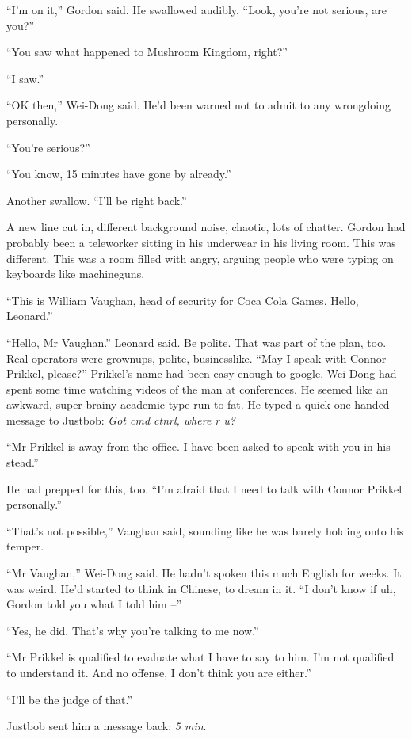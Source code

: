 ``I'm on it,'' Gordon said. He swallowed audibly. ``Look, you're not
serious, are you?''

``You saw what happened to Mushroom Kingdom, right?''

``I saw.''

``OK then,'' Wei-Dong said. He'd been warned not to admit to any
wrongdoing personally.

``You're serious?''

``You know, 15 minutes have gone by already.''

Another swallow. ``I'll be right back.''

A new line cut in, different background noise, chaotic, lots of
chatter. Gordon had probably been a teleworker sitting in his
underwear in his living room. This was different. This was a room
filled with angry, arguing people who were typing on keyboards like
machineguns.

``This is William Vaughan, head of security for Coca Cola Games.
Hello, Leonard.''

``Hello, Mr Vaughan.'' Leonard said. Be polite. That was part of the
plan, too. Real operators were grownups, polite, businesslike. ``May
I speak with Connor Prikkel, please?'' Prikkel's name had been easy
enough to google. Wei-Dong had spent some time watching videos of
the man at conferences. He seemed like an awkward, super-brainy
academic type run to fat. He typed a quick one-handed message to
Justbob: \emph{Got cmd ctnrl, where r u?}

``Mr Prikkel is away from the office. I have been asked to speak
with you in his stead.''

He had prepped for this, too. ``I'm afraid that I need to talk with
Connor Prikkel personally.''

``That's not possible,'' Vaughan said, sounding like he was barely
holding onto his temper.

``Mr Vaughan,'' Wei-Dong said. He hadn't spoken this much English for
weeks. It was weird. He'd started to think in Chinese, to dream in
it. ``I don't know if uh, Gordon told you what I told him --''

``Yes, he did. That's why you're talking to me now.''

``Mr Prikkel is qualified to evaluate what I have to say to him. I'm
not qualified to understand it. And no offense, I don't think you
are either.''

``I'll be the judge of that.''

Justbob sent him a message back: \emph{5 min}.

